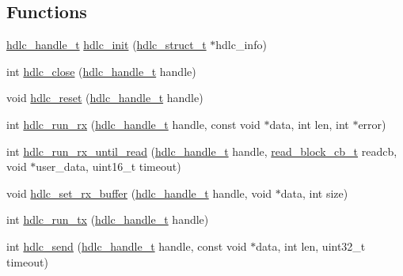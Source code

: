 \subsection*{Functions}
\begin{DoxyCompactItemize}
\item 
\hyperlink{group__HDLC__API_gabeaf7578aed5279d3af891bd85a9f961}{hdlc\+\_\+handle\+\_\+t} \hyperlink{group__HDLC__API_gaa41c388433273a76460ddfbaff0f8f5d}{hdlc\+\_\+init} (\hyperlink{group__HDLC__API_ga4537a8665b2abe023cb7fe40ea1bd024}{hdlc\+\_\+struct\+\_\+t} $\ast$hdlc\+\_\+info)
\item 
int \hyperlink{group__HDLC__API_ga21d727583f0f4534c8e4688eafcec66f}{hdlc\+\_\+close} (\hyperlink{group__HDLC__API_gabeaf7578aed5279d3af891bd85a9f961}{hdlc\+\_\+handle\+\_\+t} handle)
\item 
void \hyperlink{group__HDLC__API_ga532836280097de1c8881df8336f21075}{hdlc\+\_\+reset} (\hyperlink{group__HDLC__API_gabeaf7578aed5279d3af891bd85a9f961}{hdlc\+\_\+handle\+\_\+t} handle)
\item 
int \hyperlink{group__HDLC__API_ga911a3f1cb32dd6cadd00223e0097642c}{hdlc\+\_\+run\+\_\+rx} (\hyperlink{group__HDLC__API_gabeaf7578aed5279d3af891bd85a9f961}{hdlc\+\_\+handle\+\_\+t} handle, const void $\ast$data, int len, int $\ast$error)
\item 
int \hyperlink{group__HDLC__API_gaf20d86bb10361096f507838394c624c7}{hdlc\+\_\+run\+\_\+rx\+\_\+until\+\_\+read} (\hyperlink{group__HDLC__API_gabeaf7578aed5279d3af891bd85a9f961}{hdlc\+\_\+handle\+\_\+t} handle, \hyperlink{tiny__types_8h_a15bec127d9ee63658563d62e92b5261b}{read\+\_\+block\+\_\+cb\+\_\+t} readcb, void $\ast$user\+\_\+data, uint16\+\_\+t timeout)
\item 
void \hyperlink{group__HDLC__API_ga73156f5cc3e59c3abb880d124de78f91}{hdlc\+\_\+set\+\_\+rx\+\_\+buffer} (\hyperlink{group__HDLC__API_gabeaf7578aed5279d3af891bd85a9f961}{hdlc\+\_\+handle\+\_\+t} handle, void $\ast$data, int size)
\item 
int \hyperlink{group__HDLC__API_gae31d921043b4f175603114c206b6b829}{hdlc\+\_\+run\+\_\+tx} (\hyperlink{group__HDLC__API_gabeaf7578aed5279d3af891bd85a9f961}{hdlc\+\_\+handle\+\_\+t} handle)
\item 
int \hyperlink{group__HDLC__API_ga8b5cc456927145cebd82b2b560a6fa10}{hdlc\+\_\+send} (\hyperlink{group__HDLC__API_gabeaf7578aed5279d3af891bd85a9f961}{hdlc\+\_\+handle\+\_\+t} handle, const void $\ast$data, int len, uint32\+\_\+t timeout)
\end{DoxyCompactItemize}


